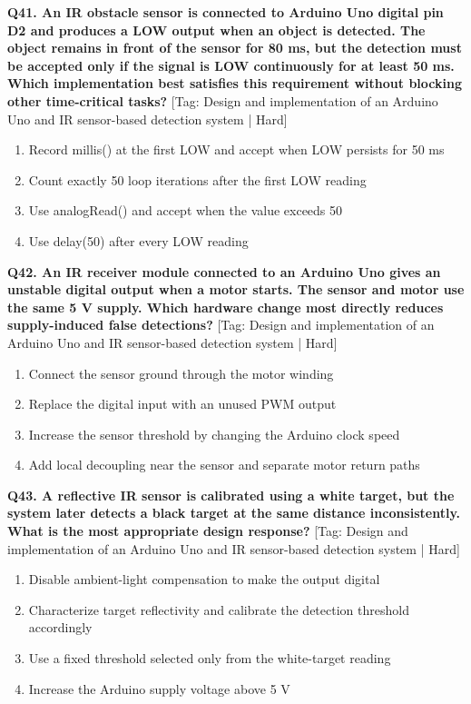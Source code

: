 \noindent\textbf{Q41. An IR obstacle sensor is connected to Arduino Uno digital pin D2 and produces a LOW output when an object is detected. The object remains in front of the sensor for 80 ms, but the detection must be accepted only if the signal is LOW continuously for at least 50 ms. Which implementation best satisfies this requirement without blocking other time-critical tasks?} \hfill [Tag: Design and implementation of an Arduino Uno and IR sensor-based detection system | Hard]
\begin{enumerate}[label=(\alph*),topsep=2pt,itemsep=1pt,partopsep=0pt,parsep=0pt]
    \item {Record millis() at the first LOW and accept when LOW persists for 50 ms}
    \item {Count exactly 50 loop iterations after the first LOW reading}
    \item {Use analogRead() and accept when the value exceeds 50}
    \item {Use delay(50) after every LOW reading}
\end{enumerate}
\vspace{2mm}

\noindent\textbf{Q42. An IR receiver module connected to an Arduino Uno gives an unstable digital output when a motor starts. The sensor and motor use the same 5 V supply. Which hardware change most directly reduces supply-induced false detections?} \hfill [Tag: Design and implementation of an Arduino Uno and IR sensor-based detection system | Hard]
\begin{enumerate}[label=(\alph*),topsep=2pt,itemsep=1pt,partopsep=0pt,parsep=0pt]
    \item {Connect the sensor ground through the motor winding}
    \item {Replace the digital input with an unused PWM output}
    \item {Increase the sensor threshold by changing the Arduino clock speed}
    \item {Add local decoupling near the sensor and separate motor return paths}
\end{enumerate}
\vspace{2mm}

\noindent\textbf{Q43. A reflective IR sensor is calibrated using a white target, but the system later detects a black target at the same distance inconsistently. What is the most appropriate design response?} \hfill [Tag: Design and implementation of an Arduino Uno and IR sensor-based detection system | Hard]
\begin{enumerate}[label=(\alph*),topsep=2pt,itemsep=1pt,partopsep=0pt,parsep=0pt]
    \item {Disable ambient-light compensation to make the output digital}
    \item {Characterize target reflectivity and calibrate the detection threshold accordingly}
    \item {Use a fixed threshold selected only from the white-target reading}
    \item {Increase the Arduino supply voltage above 5 V}
\end{enumerate}
\vspace{2mm}

